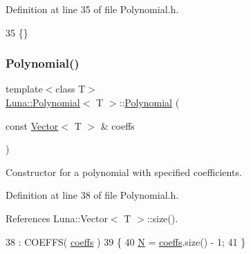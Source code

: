 Definition at line 35 of file Polynomial.\+h.


\begin{DoxyCode}
35 \{\}
\end{DoxyCode}
\mbox{\label{classLuna_1_1Polynomial_a43e11c981ef0dedc43b39dac6f375639}} 
\subsubsection{\texorpdfstring{Polynomial()}{Polynomial()}\hspace{0.1cm}{\footnotesize\ttfamily [2/3]}}
{\footnotesize\ttfamily template$<$class T$>$ \\
\hyperlink{classLuna_1_1Polynomial}{Luna\+::\+Polynomial}$<$ T $>$\+::\hyperlink{classLuna_1_1Polynomial}{Polynomial} (\begin{DoxyParamCaption}\item[{const \hyperlink{classLuna_1_1Vector}{Vector}$<$ T $>$ \&}]{coeffs }\end{DoxyParamCaption})\hspace{0.3cm}{\ttfamily [inline]}}



Constructor for a polynomial with specified coefficients. 



Definition at line 38 of file Polynomial.\+h.



References Luna\+::\+Vector$<$ T $>$\+::size().


\begin{DoxyCode}
38                                                   : COEFFS( \hyperlink{classLuna_1_1Polynomial_ab5e966c308b7e66d9c1c20666926db34}{coeffs} )
39             \{
40                 \hyperlink{namespaceHeat__plot_a7d050092798e28458a263710837bda77}{N} = \hyperlink{classLuna_1_1Polynomial_ab5e966c308b7e66d9c1c20666926db34}{coeffs}.size() - 1;
41             \}
\end{DoxyCode}
\mbox{\label{classLuna_1_1Polynomial_aca8fea74bbfd5f7ab14c96cd2e4d1693}} 
